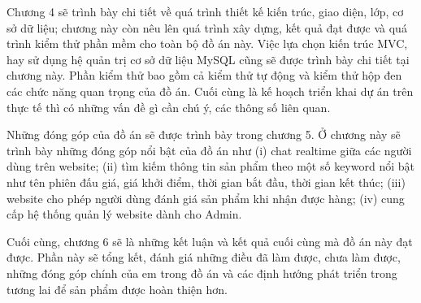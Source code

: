 \documentclass[../DoAn.tex]{subfiles}
\begin{document}
Chương 4 sẽ trình bày chi tiết về quá trình thiết kế kiến trúc, giao diện, lớp, cơ sở dữ liệu; chương này còn nêu lên quá trình xây dựng, kết quả đạt được và quá trình kiểm thử phần mềm cho toàn bộ đồ án này. Việc lựa chọn kiến trúc MVC, hay sử dụng hệ quản trị cơ sở dữ liệu MySQL cũng sẽ được trình bày chi tiết tại chương này. Phần kiểm thử bao gồm cả kiểm thử tự động và kiểm thử hộp đen các chức năng quan trọng của đồ án. Cuối cùng là kế hoạch triển khai dự án trên thực tế thì có những vấn đề gì cần chú ý, các thông số liên quan.

Những đóng góp của đồ án sẽ được trình bày trong chương 5. Ở chương này sẽ trình bày những đóng góp nổi bật của đồ án như (i) chat realtime giữa các người dùng trên website; (ii) tìm kiếm thông tin sản phẩm theo một số keyword nổi bật như tên phiên đấu giá, giá khởi điểm, thời gian bắt đầu, thời gian kết thúc; (iii) website cho phép người dùng đánh giá sản phẩm khi nhận được hàng; (iv) cung cấp hệ thống quản lý website dành cho Admin.

Cuối cùng, chương 6 sẽ là những kết luận và kết quả cuối cùng mà đồ án này đạt được. Phần này sẽ tổng kết, đánh giá những điều đã làm được, chưa làm được, những đóng góp chính của em trong đồ án và các định hướng phát triển trong tương lai để sản phẩm được hoàn thiện hơn.
\end{document}
